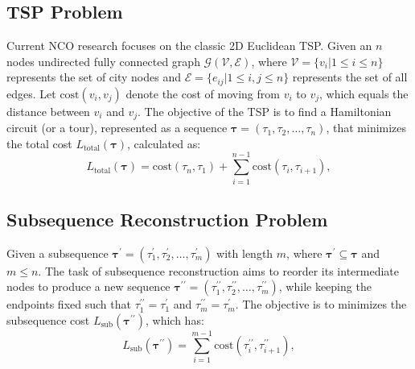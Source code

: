 \subsection{TSP Problem}
Current NCO research focuses on the classic 2D Euclidean TSP.
Given an $n$ nodes undirected fully connected graph $\mathcal{G}(\mathcal{V}, \mathcal{E})$, where $\mathcal{V}=\{v_i | 1\leq i \leq n\}$ represents the set of city nodes and $\mathcal{E}=\{e_{ij} | 1\leq i, j\leq n\}$ represents the set of all edges. Let $\text{cost}(v_i, v_j)$ denote the cost of moving from  $v_i$ to $v_j$, which equals the distance between $v_i$ and $v_j$. The objective of the TSP is to find a Hamiltonian circuit (or a tour), represented as a sequence $\boldsymbol{\tau} = (\tau_1, \tau_2, \dots, \tau_n)$, that minimizes the total cost $L_{\text{total}}(\boldsymbol{\tau})$, calculated as:
\begin{equation}
{L_{\text{total}}(\boldsymbol{\tau})=\text{cost}(\tau_n, \tau_1)+\sum\limits_{i=1}^{n-1}{\text{cost}(\tau_i, \tau_{i+1})}},
\label{eq:Balance}
\end{equation}

\subsection{Subsequence Reconstruction Problem}
Given a subsequence $\boldsymbol{\tau}^{\prime} = (\tau_1^{\prime}, \tau_2^{\prime}, \dots, \tau_{m}^{\prime})$ with length $m$, where $\boldsymbol{\tau}^{\prime} \subseteq \boldsymbol{\tau}$ and $m \leq n$. 
The task of subsequence reconstruction aims to reorder its intermediate nodes to produce a new sequence $\boldsymbol{\tau}^{\prime\prime} = (\tau_1^{\prime\prime}, \tau_2^{\prime\prime}, \dots, \tau_{m}^{\prime\prime})$, while keeping the endpoints fixed such that $\tau_1^{\prime\prime}=\tau_1^{\prime}$ and $\tau_m^{\prime\prime}=\tau_m^{\prime}$. The objective is to minimizes the subsequence cost $L_{\text{sub}}(\boldsymbol{\tau}^{\prime\prime})$, which has:
\begin{equation}
{L_{\text{sub}}(\boldsymbol{\tau}^{\prime\prime})=\sum\limits_{i=1}^{m-1}{\text{cost}(\tau_i^{\prime\prime}, \tau_{i+1}^{\prime\prime})}},
\label{eq:Balance}
\end{equation}

